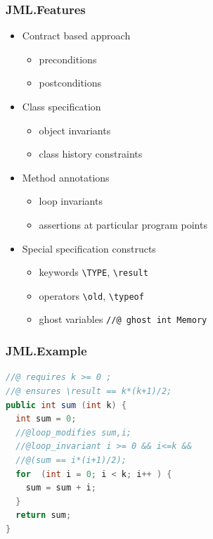 \documentclass{beamer}
\begin{document}
\begin{frame}\frametitle{JML.Features}
  \begin{itemize}
     \item Contract based approach
             \begin{itemize}
	         \item preconditions
		 \item postconditions
	     \end{itemize}
       \item Class specification 
	 \begin{itemize}
	         \item object invariants
		 \item class history constraints
	     \end{itemize}
       \item Method annotations
	  \begin{itemize}
	         \item loop invariants 
		   \item assertions at particular program points
	    \end{itemize}

	         \item Special specification constructs  
	  \begin{itemize}
	         \item keywords \lstinline!\TYPE!, \lstinline!\result!
		 \item operators   \lstinline!\old!, \lstinline!\typeof!
		 \item ghost variables   \lstinline!//@ ghost int Memory!
	    \end{itemize}

  \end{itemize}

\end{frame}

\begin{frame}\frametitle{JML.Example}
  \begin{lstlisting}[language=java]
//@ requires k >= 0 ;
//@ ensures \result == k*(k+1)/2;
public int sum (int k) {
  int sum = 0;		
  //@loop_modifies sum,i;
  //@loop_invariant i >= 0 && i<=k && 
  //@(sum == i*(i+1)/2);
  for  (int i = 0; i < k; i++ ) {
    sum = sum + i;
  } 	
  return sum;
}
\end{lstlisting} 
\end{frame}
\end{document}
